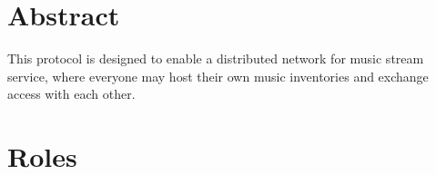 \documentclass[a4paper,11pt]{article}
\begin{document}
\fulldoctitle






\section*{Abstract}

This protocol is designed to enable a distributed network for music stream service,
where everyone may host their own music inventories and exchange access with each other.










\Nmaketoc\clearpage












\section{Roles}



\end{document}
